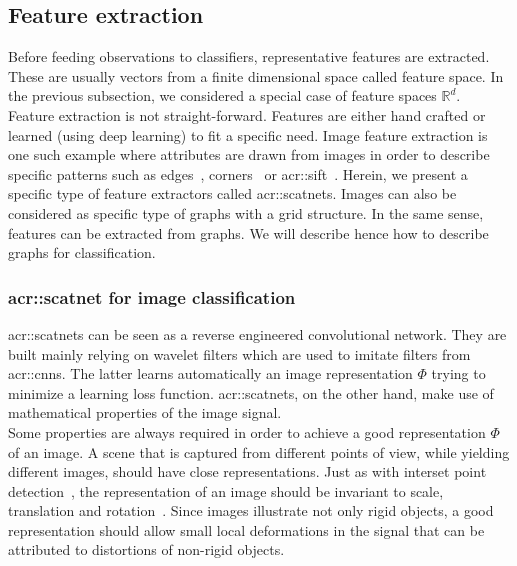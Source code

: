     \subsection{Feature extraction}
        \label{subsec::state_of_the_art::mlpr::feature_extraction}
            Before feeding observations to classifiers, representative features are extracted.
            These are usually vectors from a finite dimensional space called feature space.
            In the previous subsection, we considered a special case of feature spaces $\mathbb{R}^d$.\\

            Feature extraction is not straight-forward.
            Features are either hand crafted or learned (using deep learning) to fit a specific need.
            Image feature extraction is one such example where attributes are drawn from images in order to describe specific patterns such as edges~\parencite{canny1986computational}, corners~\parencite{harris1988combined} or \gls{acr::sift}~\parencite{lowe2004distinctive}.
            Herein, we present a specific type of feature extractors called \glspl{acr::scatnet}.
            Images can also be considered as specific type of graphs with a grid structure.
            In the same sense, features can be extracted from graphs.
            We will describe hence how to describe graphs for classification.

        \subsubsection{\acrlong*{acr::scatnet} for image classification}
            \label{subsubsec::state_of_the_art::mlpr::feature_extraction::scatnet}
            \glspl{acr::scatnet} can be seen as a reverse engineered convolutional network.
            They are built mainly relying on wavelet filters which are used to imitate filters from \glspl{acr::cnn}.
            The latter learns automatically an image representation $\Phi$ trying to minimize a learning loss function.
            \Glspl{acr::scatnet}, on the other hand, make use of mathematical properties of the image signal.\\

            Some properties are always required in order to achieve a good representation $\Phi$ of an image. 
            A scene that is captured from different points of view, while yielding different images, should have close representations.
            Just as with interset point detection~\parencite{lowe2004distinctive}, the representation of an image should be invariant to scale, translation and rotation~\parencite{mallat2012group,sifre2013rotation,bruna2013invariant}.
            Since images illustrate not only rigid objects, a good representation should allow small local deformations in the signal that can be attributed to distortions of non-rigid objects.\\

